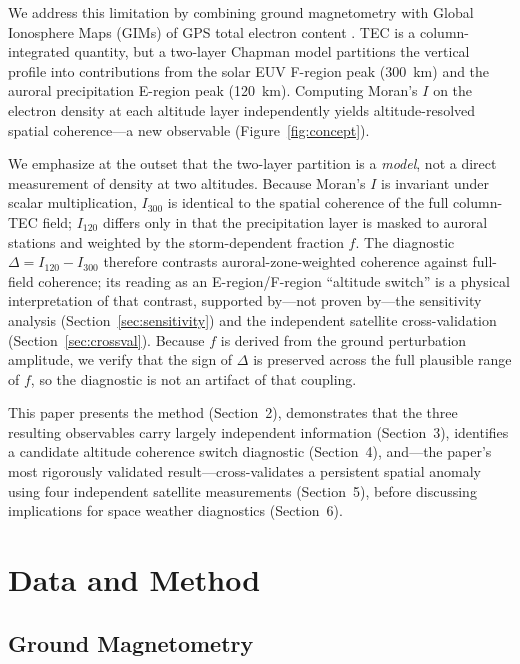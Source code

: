 \documentclass[11pt,letterpaper]{article}
\begin{document}
We address this limitation by combining ground magnetometry with Global
Ionosphere Maps (GIMs) of GPS total electron content \citep{schaer1999mapping}.
TEC is a column-integrated quantity, but a two-layer Chapman model
\citep{chapman1931absorption} partitions the vertical profile into contributions
from the solar EUV F-region peak (300~km) and the auroral precipitation E-region
peak (120~km). Computing Moran's $I$ on the electron density at each altitude
layer independently yields altitude-resolved spatial coherence---a new
observable (Figure~\ref{fig:concept}).

We emphasize at the outset that the two-layer partition is a \emph{model}, not a
direct measurement of density at two altitudes. Because Moran's $I$ is invariant
under scalar multiplication, $I_{300}$ is identical to the spatial coherence of
the full column-TEC field; $I_{120}$ differs only in that the precipitation layer
is masked to auroral stations and weighted by the storm-dependent fraction $f$.
The diagnostic $\Delta = I_{120} - I_{300}$ therefore contrasts
auroral-zone-weighted coherence against full-field coherence; its reading as an
E-region/F-region ``altitude switch'' is a physical interpretation of that
contrast, supported by---not proven by---the sensitivity analysis
(Section~\ref{sec:sensitivity}) and the independent satellite cross-validation
(Section~\ref{sec:crossval}). Because $f$ is derived from the ground perturbation
amplitude, we verify that the sign of $\Delta$ is preserved across the full
plausible range of $f$, so the diagnostic is not an artifact of that coupling.

This paper presents the method (Section~2), demonstrates that the three
resulting observables carry largely independent information (Section~3),
identifies a candidate altitude coherence switch diagnostic (Section~4), and---the
paper's most rigorously validated result---cross-validates a persistent spatial
anomaly using four independent satellite measurements (Section~5), before
discussing implications for space weather diagnostics (Section~6).

\section{Data and Method}

\subsection{Ground Magnetometry}
\end{document}
